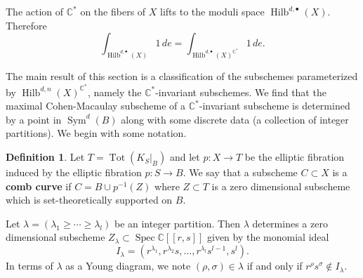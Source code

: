 \documentclass[12pt]{amsart}
\theoremstyle{definition}
\newtheorem{definition}[theorem]{Definition}
\newcommand{\CC} {\mathbb{C}}          %
\newcommand{\Sym}{\operatorname{Sym}}
\newcommand{\Hilb}{\operatorname{Hilb}}
\newcommand{\Tot}{\operatorname{Tot}}
\newcommand{\Spec}{\operatorname{Spec}}
\begin{document}
The action of $\CC^*$ on the fibers of $X$ lifts to the moduli space
$\Hilb^{d,\bullet}(X)$. Therefore
$$
\int_{\Hilb^{d,\bullet}(X)} 1 \, de = \int_{\Hilb^{d,\bullet}(X)^{\CC^*}} 1 \, de.
$$

The main result of this section is a classification of the subschemes
parameterized by $\Hilb^{d,n}(X)^{\CC^{*}}$, namely the
$\CC^{*}$-invariant subschemes.  We find that the maximal
Cohen-Macaulay subscheme of a $\CC^{*}$-invariant subscheme is
determined by a point in $\Sym^{d}(B)$ along with some discrete data
(a collection of integer partitions). We begin with some notation.




\begin{definition}\label{defn: comb curves} 
Let $T=\Tot(K_{S}|_{B})$ and let $p:X\to T$ be the elliptic fibration
induced by the elliptic fibration $p:S\to B$. We say that a subscheme $C\subset
X$ is a \textbf{comb curve} if $C=B\cup p^{-1}(Z) $ where $Z\subset T$
is a zero dimensional subscheme which is set-theoretically supported on
$B$.
\end{definition}

Let $\lambda =(\lambda_{1}\geq \dotsb \geq \lambda_{l}) $ be an
integer partition. Then $\lambda$ determines a zero dimensional subscheme
$Z_{\lambda}\subset \Spec \CC [[r,s]]$ given by the monomial ideal
\begin{equation}\label{eqn: monomial ideal I given by a partition lambda}
I_{\lambda}=(r^{\lambda_{1}},r^{\lambda_{2}}s,\dotsc
,r^{\lambda_{l}}s^{l-1},s^{l}).
\end{equation}
In terms of $\lambda$ as a Young diagram, we note $(\rho ,\sigma)\in
\lambda$ if and only if $r^{\rho}s^{\sigma}\notin I_{\lambda}.$
\end{document}
